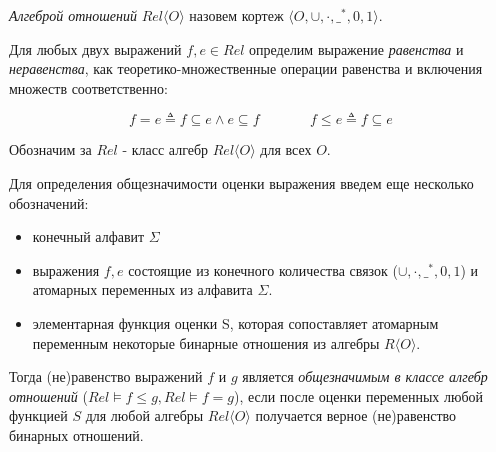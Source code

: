 \documentclass[times
              ]{itmo-student-thesis}
\begin{document}
      \textit{Алгеброй отношений} $\mathit{Rel}\langle O \rangle$
      назовем кортеж  $\langle O, \cup, \cdot, \_^* , 0, 1\rangle $.

      Для любых двух выражений $ f, e \in \mathit{Rel}$ определим выражение \textit{равенства} и
      \textit{неравенства}, как теоретико-множественные операции равенства и включения множеств
      соответственно:

      $$ f = e \triangleq f \subseteq e \wedge e \subseteq f \;\;\;\;\;\;\;\;\;\;\;\;\; f \leq e \triangleq f \subseteq e $$

      Обозначим за $\mathit{Rel}$ - класс алгебр $ \mathit{Rel}\langle O \rangle $ для всех $ O $.

      Для определения общезначимости оценки выражения введем еще несколько обозначений:
      \begin{itemize}
        \item конечный алфавит $ \Sigma $
        \item выражения $ f, e $ состоящие из конечного количества связок
        ($ \cup, \cdot, \_^* , 0, 1 $) и атомарных переменных из алфавита $ \Sigma $.
        \item элементарная функция оценки S, которая сопоставляет атомарным переменным некоторые
          бинарные отношения из алгебры $ R \langle O \rangle $.
      \end{itemize}
      Тогда (не)равенство выражений $ f $ и $ g $ является \textit{общезначимым в классе алгебр отношений}
      ($\mathit{Rel} \models f \leq g, \mathit{Rel} \models f = g $),
      если после оценки переменных любой функцией $ S $ для любой алгебры $ \mathit{Rel}\langle O \rangle $
      получается верное (не)равенство бинарных отношений.

%
%
\end{document}
